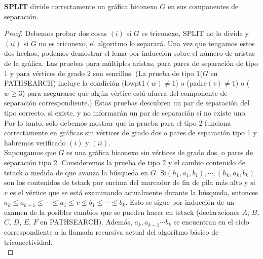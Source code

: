 \newpage

\begin{lemma}
\textbf{SPLIT} divide correctamente un gráfica biconexo $G$ en sus componentes de separación.
\label{lema:3.14}
\end{lemma}

\begin{proof}
Debemos probar dos cosas $\left(i\right)$ si $G$ es triconexo, SPLIT no lo divide y $\left(ii\right)$ si $G$ no es triconexo, el algoritmo lo separará. Una vez que tengamos estos dos hechos, podemos demostrar el lema por inducción sobre el número de aristas de la gráfica. Las pruebas para múltiples aristas, para pares de separación de tipo 1 y para vértices de grado 2 son sencillos. (La prueba de tipo 1($G$ en PATHSEARCH) incluye la condición (lowpt1$\left(w\right) \neq 1$) o (padre$\left(v\right) \neq 1$) o ($w \ge 3$) para asegurarse que algún vértice está afuera del componente de separación correspondiente.) Estas pruebas descubren un par de separación del tipo correcto, si existe, y no informarán un par de separación si no existe uno. Por lo tanto, solo debemos mostrar que la prueba para el tipo 2 funciona correctamente en gráficas sin vértices de grado dos o pares de separación tipo 1 y habremos verificado $\left(i\right)$ y $\left(ii\right)$.\\
Supongamos que $G$ es una gráfica biconexo sin vértices de grado dos, o pares de separación tipo 2. Consideremos la prueba de tipo 2 y el cambio contenido de tstack a medida de que avanza la búsqueda en $G$. Si$(h_{1}, a_{1}, b_{1}), \cdots , (h_{k}, a_{k}, b_{k})$ son los contenidos de tstack por encima del marcador de fin de pila más alto y si $v$ es el vértice que se está examinando actualmente durante la búsqueda, entonces $a_{k} \leq a_{k-1} \leq \cdots \leq a_{1} \leq v \leq b_{1} \leq \cdots \leq b_{k}$. Esto se sigue por inducción de un examen de la  posibles cambios que se pueden hacer en tstack (declaraciones $A$, $B$, $C$, $D$, $E$, $F$ en PATHSEARCH). Además, $a_{k}, a_{k-1} \cdots b_{k}$ se encuentran en el ciclo correspondiente a la llamada recursiva actual del algoritmo básico de triconectividad.\\

\end{proof}
